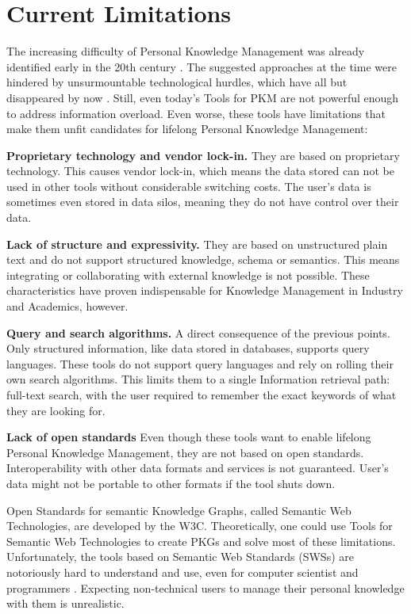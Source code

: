 \section{Current Limitations}
The increasing difficulty of Personal Knowledge Management was already identified early in the 20th century \cite{Bush1945Memex, Engelbart1962AHI}. The suggested approaches at the time were hindered by unsurmountable technological hurdles, which have all but disappeared by now \cite{Davies2005Memex60}. Still, even today's Tools for PKM are not powerful enough to address information overload. Even worse, these tools have limitations that make them unfit candidates for lifelong Personal Knowledge Management:

    \textbf{Proprietary technology and vendor lock-in.} They are based on proprietary technology. This causes vendor lock-in, which means the data stored can not be used in other tools without considerable switching costs. The user's data is sometimes even stored in data silos, meaning they do not have control over their data.

    \textbf{Lack of structure and expressivity.} They are based on unstructured plain text and do not support structured knowledge, schema or semantics. This means integrating or collaborating with external knowledge is not possible. These characteristics have proven indispensable for Knowledge Management in Industry and Academics, however. 
    
    \textbf{Query and search algorithms.} A direct consequence of the previous points. Only structured information, like data stored in databases, supports query languages. These tools do not support query languages and rely on rolling their own search algorithms. This limits them to a single Information retrieval path: full-text search, with the user required to remember the exact keywords of what they are looking for.
    
    \textbf{Lack of open standards} Even though these tools want to enable lifelong Personal Knowledge Management, they are not based on open standards. Interoperability with other data formats and services is not guaranteed. User's data might not be portable to other formats if the tool shuts down.

Open Standards for semantic Knowledge Graphs, called Semantic Web Technologies, are developed by the W3C. Theoretically, one could use Tools for Semantic Web Technologies to create PKGs and solve most of these limitations. Unfortunately, the tools based on Semantic Web Standards (SWSs) are notoriously hard to understand and use, even for computer scientist and programmers \cite{EasierRDF}. Expecting non-technical users to manage their personal knowledge with them is unrealistic.

